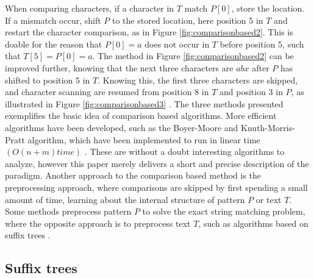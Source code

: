 \documentclass[12pt]{article} %
\begin{document}
When comparing characters, if a character in $T$ match $P[0]$, store the location. If a mismatch occur, shift $P$ to the stored location, here position 5 in $T$ and restart the character comparison, as in Figure \ref{fig:comparisonbased2}. This is doable for the reason that $P[0]=a$ does not occur in $T$ before position 5, such that $T[5]=P[0]=a$. 
The method in Figure \ref{fig:comparisonbased2} can be improved further, knowing that the next  three  characters are $abx$ after $P$ has shifted to position 5 in $T$. Knowing this, the first three characters are skipped, and character scanning are resumed from position 8 in $T$ and position 3 in $P$, as illustrated in Figure \ref{fig:comparisonbased3} \cite{gusfield}. 
\newline
The three methods presented exemplifies the basic idea of comparison based algorithms. More efficient algorithms have been developed, such as the Boyer-Moore and Knuth-Morris-Pratt algorithm, which have been implemented to run in linear time $(O(n+m) time)$ \cite{gusfield}. These are without a doubt interesting algorithms to analyze, however this paper merely delivers a short and precise description of the paradigm.
Another approach to the comparison based method is the preprocessing approach, where comparisons are skipped by first spending a small amount of time, learning about the internal structure of pattern $P$ or text $T$. Some methods preprocess pattern $P$ to solve the exact string matching problem, where the opposite approach is to preprocess text $T$, such as algorithms based on suffix trees \cite{gusfield}.

\subsection{Suffix trees}
\end{document}
